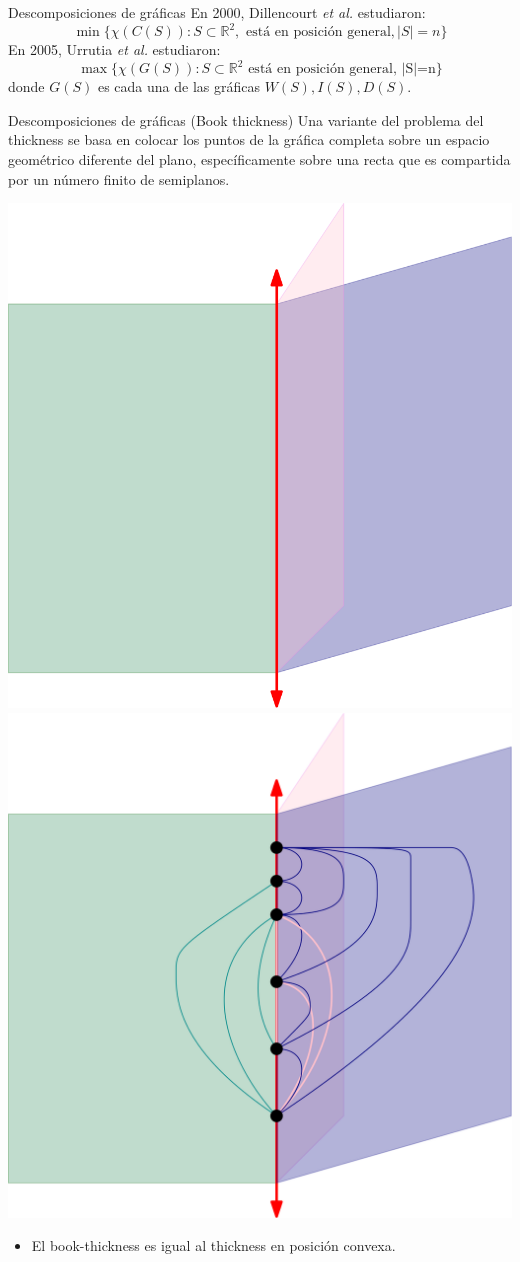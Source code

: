 \begin{frame}{Descomposiciones de gráficas}
		En 2000, Dillencourt \emph{et al.} estudiaron: 
		\[ 
			\min\{ \chi(C(S)): S \subset \mathbb{R}^2,\text{ está en posición general}, |S|=n \}
		\]
		En 2005, Urrutia \emph{et al.} estudiaron: \[\max\{\chi(G(S)): S \subset \mathbb{R}^2 \text{ está en posición general, |S|=n} \}\] donde $G(S)$ es cada una de las gráficas $W(S),I(S),D(S)$.
\end{frame}
\begin{frame}{Descomposiciones de gráficas (Book thickness)}
	Una variante del problema del thickness se basa en colocar los puntos de la gráfica completa sobre un espacio geométrico diferente del plano, específicamente sobre una recta que es compartida por un número finito de semiplanos. 
	\begin{center}
		\includegraphics[width=0.4\linewidth]{images/book}
		\includegraphics[width=0.4\linewidth]{images/book-thickness}
	\end{center}

	\begin{itemize}
		\item El book-thickness es igual al thickness en posición convexa.
	\end{itemize}
	
\end{frame}
